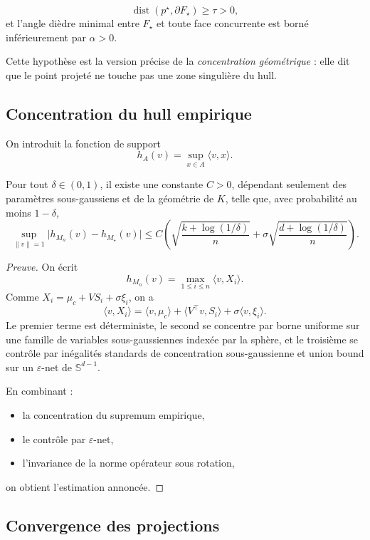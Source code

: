 \[
\operatorname{dist}\!\left(p^\star,\partial F_\star\right)\ge \tau>0,
\]
et l'angle dièdre minimal entre \(F_\star\) et toute face concurrente est borné inférieurement par \(\alpha>0\).

Cette hypothèse est la version précise de la \emph{concentration géométrique} : elle dit que le point projeté ne touche pas une zone singulière du hull.

\subsection{Concentration du hull empirique}

On introduit la fonction de support
\[
h_A(v)=\sup_{x\in A}\langle v,x\rangle.
\]

\begin{theorem}
Pour tout \(\delta\in(0,1)\), il existe une constante \(C>0\), dépendant seulement des paramètres sous-gaussiens et de la géométrie de \(K\), telle que, avec probabilité au moins \(1-\delta\),
\[
\sup_{\|v\|=1}\bigl|h_{M_n}(v)-h_{M_\star}(v)\bigr|
\le
C\left(
\sqrt{\frac{k+\log(1/\delta)}{n}}
+
\sigma\sqrt{\frac{d+\log(1/\delta)}{n}}
\right).
\]
\end{theorem}

\begin{proof}[Preuve]
On écrit
\[
h_{M_n}(v)=\max_{1\le i\le n}\langle v,X_i\rangle.
\]
Comme \(X_i=\mu_c+VS_i+\sigma\xi_i\), on a
\[
\langle v,X_i\rangle
=
\langle v,\mu_c\rangle
+
\langle V^\top v,S_i\rangle
+
\sigma\langle v,\xi_i\rangle.
\]
Le premier terme est déterministe, le second se concentre par borne uniforme sur une famille de variables sous-gaussiennes indexée par la sphère, et le troisième se contrôle par inégalités standards de concentration sous-gaussienne et union bound sur un \(\varepsilon\)-net de \(\mathbb S^{d-1}\).

En combinant :
\begin{itemize}
    \item la concentration du supremum empirique,
    \item le contrôle par \(\varepsilon\)-net,
    \item l'invariance de la norme opérateur sous rotation,
\end{itemize}
on obtient l'estimation annoncée.
\end{proof}

\subsection{Convergence des projections}

